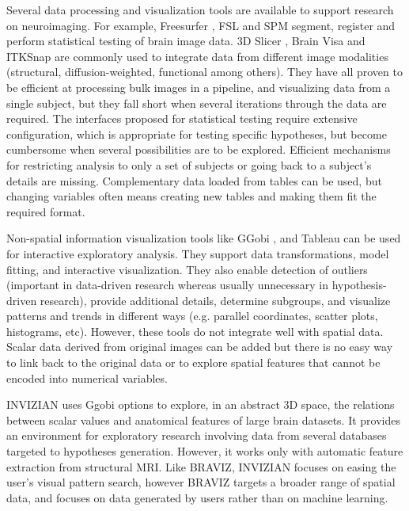 \documentclass[twocolumn]{svjour3}
\begin{document}
Several data processing and visualization tools are available to support research on neuroimaging. For example, Freesurfer \cite{fischl_freesurfer_2012}, FSL \cite{jenkinson_fsl_2012} and SPM \cite{friston_statistical_2006} segment, register and perform statistical testing of brain image data. 3D Slicer \cite{fedorov_3d_2012}, Brain Visa \cite{cointepas_brainvisa:_2001} and ITKSnap \cite{yushkevich_user-guided_2006} are commonly used to integrate data from different image modalities (structural, diffusion-weighted, functional among others). They have all proven to be efficient at processing bulk images in a pipeline, and visualizing data from a single subject, but they fall short when several iterations through the data are required. The interfaces proposed for statistical testing require extensive configuration, which is appropriate for testing specific hypotheses, but become cumbersome when several possibilities are to be explored. Efficient mechanisms for restricting analysis to only a set of subjects or going back to a subject's details are missing. Complementary data loaded from tables can be used, but changing variables often means creating new tables and making them fit the required format.


Non-spatial information visualization tools like GGobi \cite{cook_interactive_2007}, and Tableau\cite{hanrahan_tableau_2003} can be used for interactive exploratory analysis. They support data transformations, model fitting, and interactive visualization. They also enable  detection of outliers (important in data-driven research whereas usually unnecessary in hypothesis-driven research), provide additional details, determine subgroups, and visualize patterns and trends in different ways (e.g. parallel coordinates, scatter plots, histograms, etc). However, these tools do not integrate well with spatial data. Scalar data derived from original images can be added but there is no easy way to link back to the original data or to explore spatial features that cannot be encoded into numerical variables.

INVIZIAN \cite{bowman_query-based_2011}\cite{bowman_feature-similarity_2012}\cite{bowman_visual_2012} uses Ggobi options to explore, in an abstract 3D space, the relations between scalar values and anatomical features of large brain datasets. It provides an environment for exploratory research involving data from several databases targeted to hypotheses generation. However, it works only with automatic feature extraction from structural MRI. Like BRAVIZ, INVIZIAN focuses on easing the user’s visual pattern search, however BRAVIZ targets a broader range of spatial data, and focuses on data generated by users rather than on machine learning. 
\end{document}
